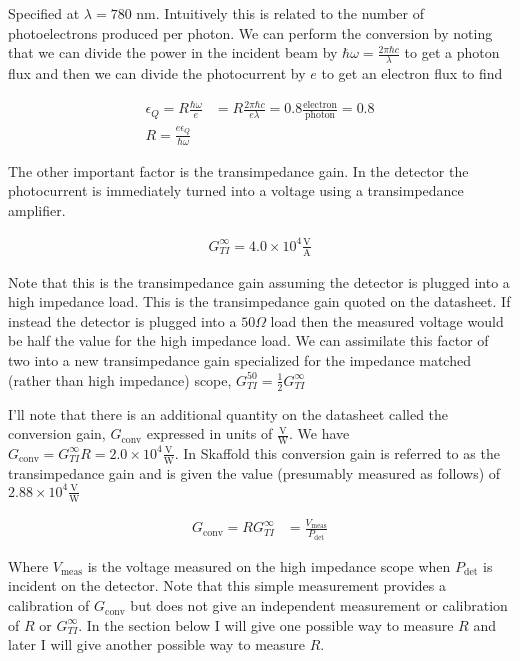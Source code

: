 \documentclass[12pt]{article}
\begin{document}
Specified at $\lambda = 780 \text{ nm}$. Intuitively this is related to the number of photoelectrons produced per photon. We can perform the conversion by noting that we can divide the power in the incident beam by $\hbar \omega = \frac{2\pi \hbar c}{\lambda}$ to get a photon flux and then we can divide the photocurrent by $e$ to get an electron flux to find

\begin{align}
\epsilon_Q = R \frac{\hbar \omega}{e} &= R \frac{2\pi \hbar c}{e \lambda} = 0.8 \frac{\text{electron}}{\text{photon}} = 0.8\\
R = \frac{e \epsilon_Q}{\hbar \omega}
\end{align}

The other important factor is the transimpedance gain. In the detector the photocurrent is immediately turned into a voltage using a transimpedance amplifier. 

\begin{align}
G_{TI}^{\infty} = 4.0 \times 10^4 \frac{\text{V}}{\text{A}}
\end{align}

Note that this is the transimpedance gain assuming the detector is plugged into a high impedance load. This is the transimpedance gain quoted on the datasheet. If instead the detector is plugged into a $50 \Omega$ load then the measured voltage would be half the value for the high impedance load. We can assimilate this factor of two into a new transimpedance gain specialized for the impedance matched (rather than high impedance) scope, $G_{TI}^{50} = \frac{1}{2} G_{TI}^{\infty}$

I'll note that there is an additional quantity on the datasheet called the conversion gain, $G_{\text{conv}}$ expressed in units of $\frac{\text{V}}{\text{W}}$. We have $G_{\text{conv}} = G_{TI}^{\infty} R = 2.0 \times 10^4 \frac{\text{V}}{\text{W}}$. In Skaffold this conversion gain is referred to as the transimpedance gain and is given the value (presumably measured as follows) of $2.88 \times 10^4 \frac{\text{V}}{\text{W}}$ 

\begin{align}
G_{\text{conv}} = R G_{TI}^{\infty} &= \frac{V_{\text{meas}}}{P_{\text{det}}}
\end{align}

Where $V_{\text{meas}}$ is the voltage measured on the high impedance scope when $P_{\text{det}}$ is incident on the detector. Note that this simple measurement provides a calibration of $G_{\text{conv}}$ but does not give an independent measurement or calibration of $R$ or $G_{TI}^{\infty}$. In the section below I will give one possible way to measure $R$ and later I will give another possible way to measure $R$.
\end{document}
